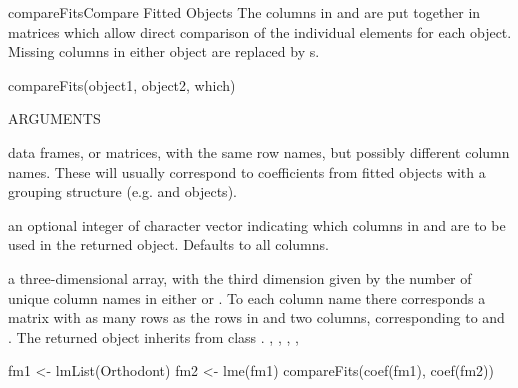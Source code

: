 \documentclass[pdftex]{article} \usepackage{url,graphicx}
\begin{document}
\begin{Helpfile}{compareFits}{Compare Fitted Objects}
The columns in  and  are put together in
matrices which allow direct comparison of the individual elements for
each object. Missing columns in either object are replaced by
s.
\begin{Example}
compareFits(object1, object2, which)
\end{Example}
\begin{Argument}{ARGUMENTS}
\item[\Co{object1,object2:}]
data frames, or matrices, with the same
row names, but possibly different column names. These will usually
correspond to coefficients from fitted objects with a grouping
structure (e.g.  and  objects).
\item[\Co{which:}]
an optional integer of character vector indicating which
columns in  and  are to be used in the
returned object. Defaults to all columns.
\end{Argument}
a three-dimensional array, with the third dimension given by the number
of unique column names in either  or . To
each column name there corresponds a matrix with as many rows as the
rows in  and two columns, corresponding to 
and . The returned object inherits from class
.
,
, ,
, 
\need 15pt
\vspace{-16pt} 
\begin{Example}
fm1 <- lmList(Orthodont)
fm2 <- lme(fm1)
compareFits(coef(fm1), coef(fm2))
\end{Example}
\end{Helpfile}
\end{document}
